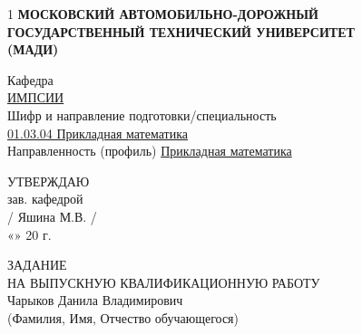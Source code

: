 \documentclass[14pt, a4paper]{extarticle}
\begin{document}
\thispagestyle{empty}

\begin{center}
    \begin{spacing}{1}
        \large\textbf{МОСКОВСКИЙ АВТОМОБИЛЬНО-ДОРОЖНЫЙ} \\
        \large\textbf{ГОСУДАРСТВЕННЫЙ ТЕХНИЧЕСКИЙ УНИВЕРСИТЕТ} \\ [0.1cm]
        \textbf{(МАДИ)}
    \end{spacing}
\end{center}

\vspace{-1.5cm}

\noindent
\begin{minipage}[t]{0.70\textwidth}
    \vspace{0pt}
    \raggedright
    Кафедра \\
    \underline{ИМПСИИ} \\ [0.2cm]
    Шифр и направление подготовки/специальность \\
    \underline{01.03.04 Прикладная математика} \\ [0.2cm]
    Направленность (профиль) \uline{Прикладная математика}

\end{minipage}%
\begin{minipage}[t]{0.30\textwidth}
    \vspace{5cm}
    \begin{flushright}
        \begin{minipage}{\textwidth}
            \raggedleft
            УТВЕРЖДАЮ \\
            зав. кафедрой \\ [0.6cm]
            \underline{\hspace{1.8cm}} / Яшина М.В. / \\ [0.4cm]
            «\underline{\hspace{0.7cm}}» \underline{\hspace{2.2cm}} 20\underline{\hspace{0.5cm}} г.
        \end{minipage}
    \end{flushright}
\end{minipage}

\vspace{1cm}
\begin{center}
    ЗАДАНИЕ \\
    НА ВЫПУСКНУЮ КВАЛИФИКАЦИОННУЮ РАБОТУ \\ [0.3cm]
    Чарыков Данила Владимирович \\
    \small{(Фамилия, Имя, Отчество обучающегося)}
\end{center}
\end{document}

